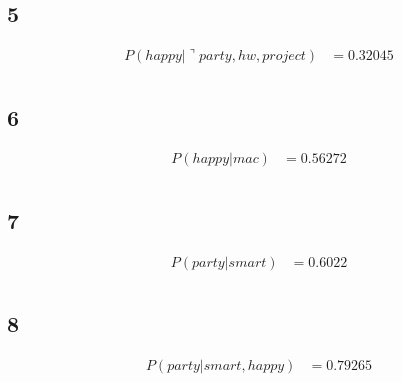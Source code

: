 \documentclass[letterpaper, 12pt]{artikel3}
\begin{document}
\subsection*{5}%
\begin{align*}
P(happy| \urcorner party, hw, project) &= 0.32045 \\
\end{align*}
\subsection*{6}%
\begin{align*}
P(happy| mac) &= 0.56272\\
\end{align*}
\subsection*{7}%
\begin{align*}
P(party| smart) &= 0.6022\\
\end{align*}

\subsection*{8}%
\begin{align*}
P(party| smart, happy) &= 0.79265\\
\end{align*}
\end{document}
